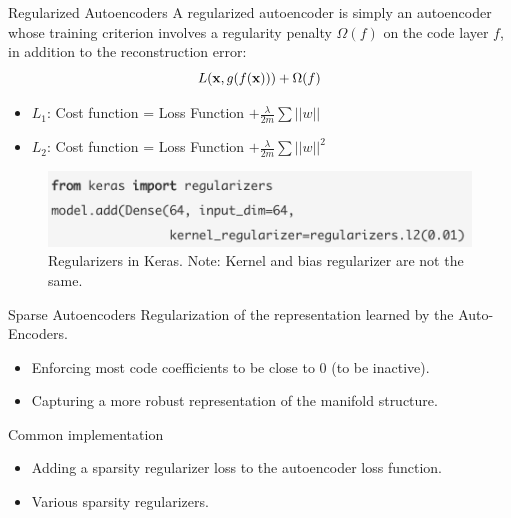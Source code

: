 \documentclass[handout,xcolor=pdftex,dvipsnames,table,mathserif]{beamer}
\begin{document}
\begin{frame}{Regularized Autoencoders}
A regularized autoencoder is simply an autoencoder whose training criterion involves a
regularity penalty $\Omega(f)$ on the code layer $f$, in addition to the reconstruction error:
\begin{equation}
L ( \mathbf{x} , g(f(\mathbf{x})))+\Omega(f)
\end{equation}
\begin{itemize}
\item $L_1$: Cost function = Loss Function $+ \frac{\lambda}{2 m } \sum ||w||$
\item $L_2$:  Cost function = Loss Function $+ \frac{\lambda}{2 m } \sum ||w||^2$
\end{itemize}
\begin{figure}
\includegraphics[width=\columnwidth]{../graphics/regularizers}
\caption{Regularizers in Keras. Note: Kernel and bias regularizer are not the same.}
\end{figure}
\end{frame}

\begin{frame}{Sparse Autoencoders}
Regularization of the representation learned by the Auto-Encoders.
\begin{itemize}
\item Enforcing most code coefficients to be close to 0 (to be inactive).
\item Capturing a more robust representation of the manifold structure.
\end{itemize}
Common implementation
\begin{itemize}
\item Adding a sparsity regularizer loss to the autoencoder loss function.
\item Various sparsity regularizers.
\end{itemize}
\end{frame}


\end{document}
